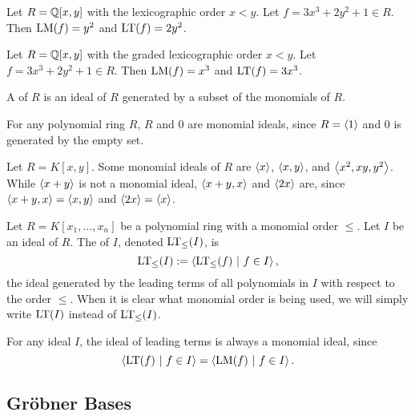 \begin{example}
  Let $R = \mathbb{Q}[x,y]$ with the lexicographic order $x < y$.
  Let $f = 3x^3 + 2y^2 + 1 \in R$.
  Then $\operatorname{LM}(f) = y^2$ and $\operatorname{LT}(f) = 2y^2$.
\end{example}
\begin{example}
  Let $R = \mathbb{Q}[x,y]$ with the graded lexicographic order $x < y$.
  Let $f = 3x^3 + 2y^2 + 1 \in R$.
  Then $\operatorname{LM}(f) = x^3$ and $\operatorname{LT}(f) = 3x^3$.
\end{example}

A  of $R$ is an ideal of $R$ generated by a subset of the monomials of $R$.
\begin{example}
  For any polynomial ring $R$, $R$ and $0$ are monomial ideals,
  since $R = \left\langle 1 \right\rangle$ and $0$ is generated by the empty set.
\end{example}
\begin{example}
  Let $R = K[x,y]$.
  Some monomial ideals of $R$ are $\left\langle x \right\rangle$, $\left\langle x,y \right\rangle$, and $\left\langle x^2, xy, y^2 \right\rangle$.
  While $\left\langle x + y \right\rangle$ is not a monomial ideal, $\left\langle x + y, x \right\rangle$ and $\left\langle 2x \right\rangle$ are,
  since $\left\langle x + y, x \right\rangle = \left\langle x, y \right\rangle$ and $\left\langle 2x \right\rangle = \left\langle x \right\rangle$.
\end{example}

\begin{definition}
  Let $R = K[x_1, \ldots, x_n]$ be a polynomial ring with a monomial order $\leq$.
  Let $I$ be an ideal of $R$.
  The  of $I$, denoted $\operatorname{LT}_\leq(I)$, is
  \begin{equation*}
    \operatorname{LT}_\leq(I) := \left\langle  \operatorname{LT}_\leq(f) ~|~ f \in I  \right\rangle,
  \end{equation*}
  the ideal generated by the leading terms of all polynomials in $I$ with respect to the order $\leq$.
  When it is clear what monomial order is being used, we will simply write $\operatorname{LT}(I)$ instead of $\operatorname{LT}_\leq(I)$.
\end{definition}
For any ideal $I$, the ideal of leading terms is always a monomial ideal, since
\[ \left\langle  \operatorname{LT}(f) ~|~ f \in I  \right\rangle = \left\langle  \operatorname{LM}(f) ~|~ f \in I  \right\rangle. \]




\subsection{Gr\"obner Bases} \label{sec:groebner_bases}

